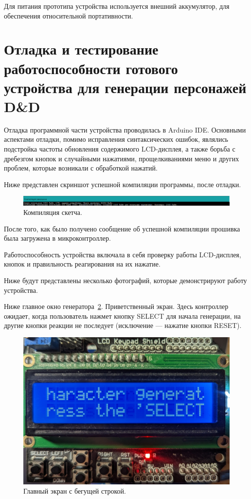 Для питания прототипа устройства используется внешний аккумулятор, для обеспечения относительной портативности.

\section{Отладка и тестирование работоспособности готового устройства для генерации персонажей D\&D}

Отладка программной части устройства проводилась в Arduino IDE. Основными аспектами отладки, помимо исправления синтаксических ошибок, являлись подстройка частоты обновления содержимого LCD-дисплея, а также борьба с дребезгом кнопок и случайными нажатиями, прощелкиваниями меню и других проблем, которые возникали с обработкой нажатий.

Ниже представлен скриншот успешной компиляции программы, после отладки.

\begin{figure}[H]
    \centering
    \includegraphics[scale=0.5]{compile.png}
    \caption{Компиляция скетча.}
    \label{fig:compile}
\end{figure}

После того, как было получено сообщение об успешной компиляции прошивка была загружена в микроконтроллер.

Работоспособность устройства включала в себя проверку работы LCD-дисплея, кнопок и правильность реагирования на их нажатие.

Ниже будут представлены несколько фотографий, которые демонстрируют работу устройства.

Ниже главное окно генератора~\ref{fig:main_window}. Приветственный экран. Здесь контроллер ожидает, когда пользователь нажмет кнопку SELECT для начала генерации, на другие кнопки реакции не последует (исключение --- нажатие кнопки RESET).

\begin{figure}[H]
    \centering
    \includegraphics[scale=0.15]{mainWindow.jpg}
    \caption{Главный экран с бегущей строкой.}
    \label{fig:main_window}
\end{figure}

